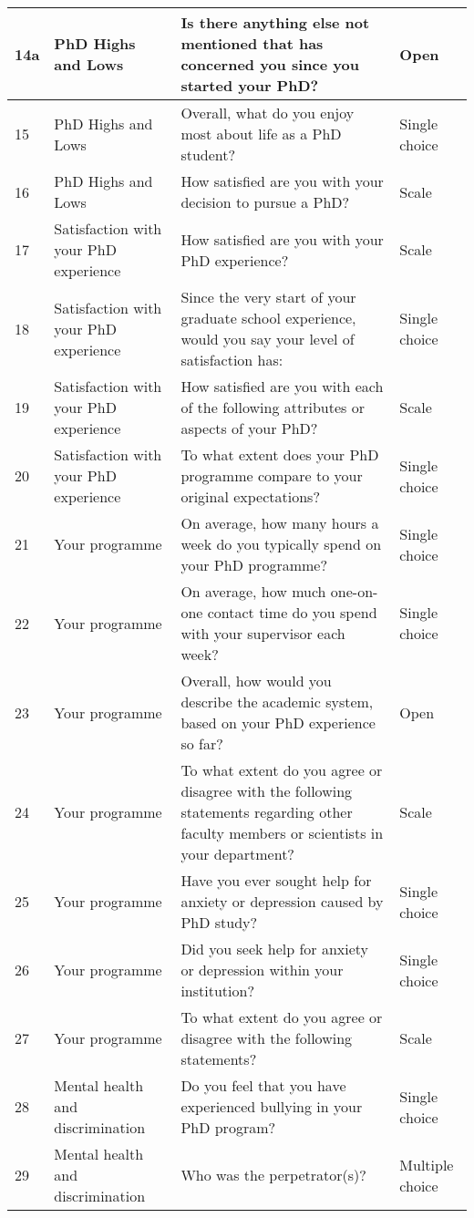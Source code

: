 \documentclass[
]{article}
\begin{document}
\begin{table}[H]
\begin{tabular}{l|l|l|l}
\hline
14a & PhD Highs and Lows & Is there anything else not mentioned that has concerned you since you started your PhD? & Open\\
\hline
15 & PhD Highs and Lows & Overall, what do you enjoy most about life as a PhD student? & Single choice\\
\hline
16 & PhD Highs and Lows & How satisfied are you with your decision to pursue a PhD? & Scale\\
\hline
17 & Satisfaction with your PhD experience & How satisfied are you with your PhD experience? & Scale\\
\hline
18 & Satisfaction with your PhD experience & Since the very start of your graduate school experience, would you say your level of satisfaction has: & Single choice\\
\hline
19 & Satisfaction with your PhD experience & How satisfied are you with each of the following attributes or aspects of your PhD? & Scale\\
\hline
20 & Satisfaction with your PhD experience & To what extent does your PhD programme compare to your original expectations? & Single choice\\
\hline
21 & Your programme & On average, how many hours a week do you typically spend on your PhD programme? & Single choice\\
\hline
22 & Your programme & On average, how much one-on-one contact time do you spend with your supervisor each week? & Single choice\\
\hline
23 & Your programme & Overall, how would you describe the academic system, based on your PhD experience so far? & Open\\
\hline
24 & Your programme & To what extent do you agree or disagree with the following statements regarding other faculty members or scientists in your department? & Scale\\
\hline
25 & Your programme & Have you ever sought help for anxiety or depression caused by PhD study? & Single choice\\
\hline
26 & Your programme & Did you seek help for anxiety or depression within your institution? & Single choice\\
\hline
27 & Your programme & To what extent do you agree or disagree with the following statements? & Scale\\
\hline
28 & Mental health and discrimination & Do you feel that you have experienced bullying in your PhD program? & Single choice\\
\hline
29 & Mental health and discrimination & Who was the perpetrator(s)? & Multiple choice\\

\end{tabular}
\end{table}
\end{document}
